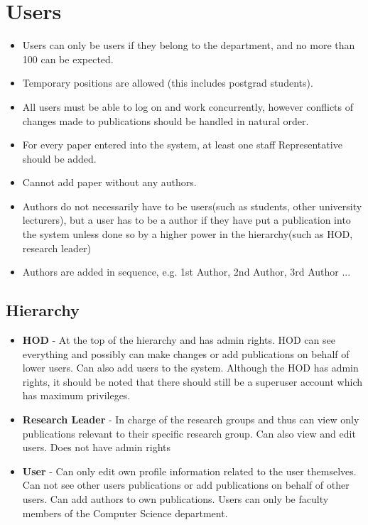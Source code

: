 \documentclass[12pt, letterpaper, twoside]{article}
\begin{document}
\section{Users}
\begin{itemize}  

    \item Users can only be users if they belong to the department, and no more than 100 can be expected.
    \item Temporary positions are allowed (this includes postgrad students).
    \item All users must be able to log on and work concurrently, however conflicts of changes made to publications should be handled in natural order.
    \item For every paper entered into the system, at least one staff Representative should be added.
    \item Cannot add paper without any authors.
    \item Authors do not necessarily have to be users(such as students, other university lecturers), but a user has to be a author if they have put a publication into the system unless done so by a higher power in the hierarchy(such as HOD, research leader)
    \item Authors are added in sequence, e.g. 1st Author, 2nd Author, 3rd Author ...
 

\end{itemize}
\subsection{Hierarchy}
\begin{itemize}  

    \item \textbf{HOD} - At the top of the hierarchy and has admin rights. HOD can see everything and possibly can make changes or add publications on behalf of lower users. Can also add users to the system. Although the HOD has admin rights, it should be noted that there should still be a superuser account which has maximum privileges.

    \item \textbf{Research Leader} - In charge of the research groups and thus can view only publications relevant to their specific research group. Can also view and edit users. Does not have admin rights
    
    \item \textbf{User} - Can only edit own profile information related to the user themselves. Can not see other users publications or add publications on behalf of other users. Can add authors to own publications. Users can only be faculty members of the Computer Science department.


\end{itemize}
\end{document}
